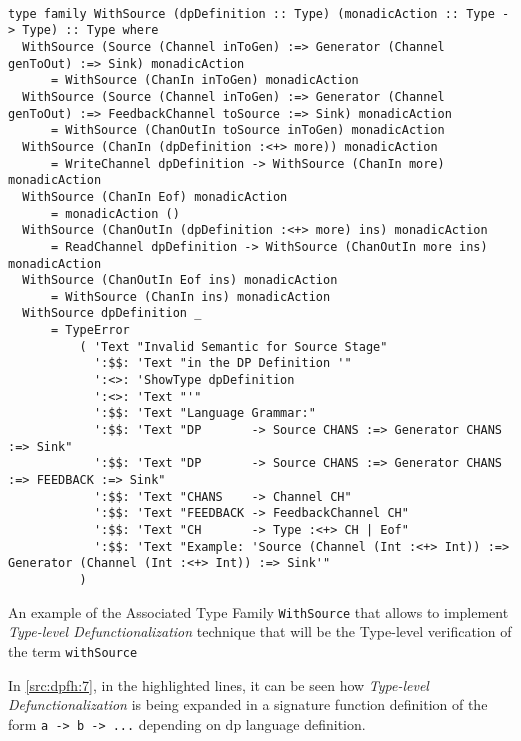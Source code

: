 \begin{listing}[htp!]
  \begin{verbatim}

type family WithSource (dpDefinition :: Type) (monadicAction :: Type -> Type) :: Type where
  WithSource (Source (Channel inToGen) :=> Generator (Channel genToOut) :=> Sink) monadicAction
      = WithSource (ChanIn inToGen) monadicAction
  WithSource (Source (Channel inToGen) :=> Generator (Channel genToOut) :=> FeedbackChannel toSource :=> Sink) monadicAction 
      = WithSource (ChanOutIn toSource inToGen) monadicAction
  WithSource (ChanIn (dpDefinition :<+> more)) monadicAction         
      = WriteChannel dpDefinition -> WithSource (ChanIn more) monadicAction
  WithSource (ChanIn Eof) monadicAction                              
      = monadicAction ()
  WithSource (ChanOutIn (dpDefinition :<+> more) ins) monadicAction  
      = ReadChannel dpDefinition -> WithSource (ChanOutIn more ins) monadicAction
  WithSource (ChanOutIn Eof ins) monadicAction                       
      = WithSource (ChanIn ins) monadicAction
  WithSource dpDefinition _                                          
      = TypeError
          ( 'Text "Invalid Semantic for Source Stage"
            ':$$: 'Text "in the DP Definition '"
            ':<>: 'ShowType dpDefinition
            ':<>: 'Text "'"
            ':$$: 'Text "Language Grammar:"
            ':$$: 'Text "DP       -> Source CHANS :=> Generator CHANS :=> Sink"
            ':$$: 'Text "DP       -> Source CHANS :=> Generator CHANS :=> FEEDBACK :=> Sink"
            ':$$: 'Text "CHANS    -> Channel CH"
            ':$$: 'Text "FEEDBACK -> FeedbackChannel CH"
            ':$$: 'Text "CH       -> Type :<+> CH | Eof"
            ':$$: 'Text "Example: 'Source (Channel (Int :<+> Int)) :=> Generator (Channel (Int :<+> Int)) :=> Sink'"
          )
  \end{verbatim}
  \caption[{[\texttt{Stage.hs}] WithSource Associate Type Details}]{An example of the Associated Type Family \texttt{WithSource} that allows to implement \emph{Type-level Defunctionalization} technique that will be the Type-level verification of the term \texttt{withSource}}
  \label{src:dpfh:7}
\end{listing}

In \autoref{src:dpfh:7}, in the highlighted lines, it can be seen how \emph{Type-level Defunctionalization} is being expanded in a signature function definition of the form \texttt{a -> b -> ...} depending on \acrshort{dp} language definition. 

